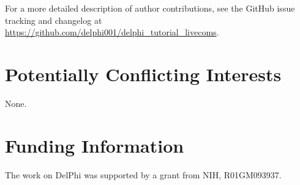 \documentclass[9pt,tutorial]{livecoms}
\newcommand{\githubrepository}{\url{https://github.com/delphi001/delphi_tutorial_livecoms}}  %
\begin{document}
For a more detailed description of author contributions,
see the GitHub issue tracking and changelog at \githubrepository.

\section{Potentially Conflicting Interests}

None.

\section{Funding Information}
The work on DelPhi was supported by a grant from NIH, R01GM093937. 





\end{document}
